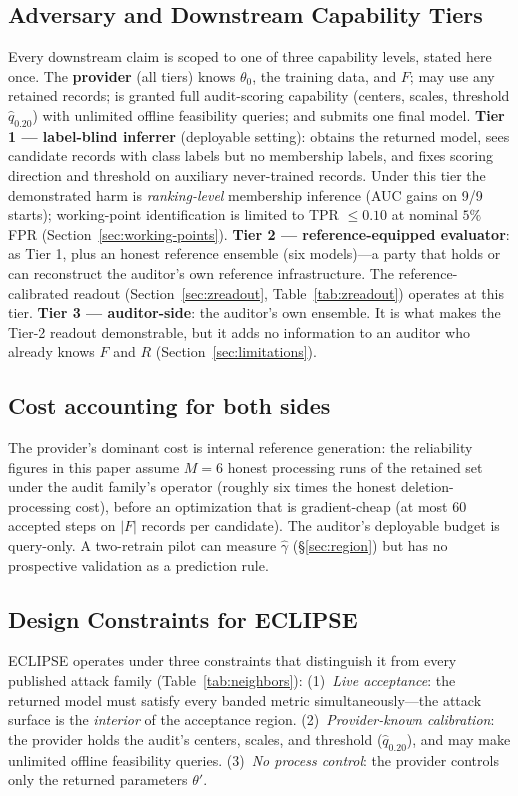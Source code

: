 \documentclass[lettersize,journal]{IEEEtran}
\begin{document}
\subsection{Adversary and Downstream Capability Tiers}
Every downstream claim is scoped to one of three capability
levels, stated here once. The \textbf{provider} (all tiers)
knows $\theta_0$, the training data, and $F$; may use any
retained records; is granted full audit-scoring capability
(centers, scales, threshold $\hat q_{0.20}$) with unlimited
offline feasibility queries; and submits one final model.
\textbf{Tier 1 --- label-blind inferrer} (deployable setting):
obtains the returned model, sees candidate records with class
labels but no membership labels, and fixes scoring direction
and threshold on auxiliary never-trained records. Under this
tier the demonstrated harm is \emph{ranking-level} membership
inference (AUC gains on 9/9 starts); working-point
identification is limited to TPR $\le 0.10$ at nominal $5\%$
FPR (Section~\ref{sec:working-points}).
\textbf{Tier 2 --- reference-equipped evaluator}: as Tier 1,
plus an honest reference ensemble (six models)---a party that
holds or can reconstruct the auditor's own reference
infrastructure. The reference-calibrated readout
(Section~\ref{sec:zreadout}, Table~\ref{tab:zreadout})
operates at this tier.
\textbf{Tier 3 --- auditor-side}: the auditor's own ensemble.
It is what makes the Tier-2 readout demonstrable, but it adds
no information to an auditor who already knows $F$ and $R$
(Section~\ref{sec:limitations}).


\subsection{Cost accounting for both sides}
The provider's dominant cost is internal reference generation:
the reliability figures in this paper assume $M = 6$ honest
processing runs of the retained set under the audit family's
operator (roughly six times the honest deletion-processing
cost), before an optimization that is gradient-cheap (at most
60 accepted steps on $|F|$ records per candidate). The
auditor's deployable budget is query-only. A
two-retrain pilot can measure $\hat\gamma$
(\S\ref{sec:region}) but has no prospective validation as a
prediction rule.



\subsection{Design Constraints for ECLIPSE}
ECLIPSE operates under three constraints that distinguish it from
every published attack family (Table~\ref{tab:neighbors}):
(1)~\emph{Live acceptance}: the returned model must satisfy every
banded metric simultaneously---the attack surface is the
\emph{interior} of the acceptance region.
(2)~\emph{Provider-known calibration}: the provider holds the
audit's centers, scales, and threshold ($\hat q_{0.20}$), and
may make unlimited offline feasibility queries.
(3)~\emph{No process control}: the provider controls only the
returned parameters $\theta'$.
\end{document}
